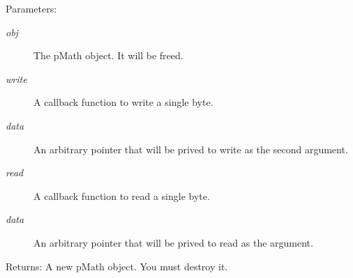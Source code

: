 \begin{Desc}
\item[Parameters:]
\begin{description}
\item[{\em obj}]The pMath object. It will be freed. \item[{\em write}]A callback function to write a single byte. \item[{\em data}]An arbitrary pointer that will be prived to write as the second argument.\item[{\em read}]A callback function to read a single byte. \item[{\em data}]An arbitrary pointer that will be prived to read as the argument. \end{description}
\end{Desc}
\begin{Desc}
\item[Returns:]A new pMath object. You must destroy it. \end{Desc}

